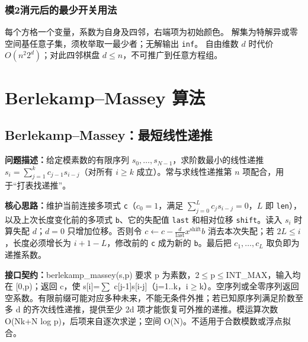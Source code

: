 \subsection{模2消元后的最少开关用法}\label{knowledge-switch-min}
每个方格一个变量，系数为自身及四邻，右端项为初始颜色。
解集为特解异或零空间基任意子集，须枚举取一最少者；无解输出 \texttt{inf}。
自由维数 $d$ 时代价 $O(n^2 2^d)$；对此四邻棋盘 $d\le n$，不可推广到任意方程组。


\Needspace{360pt}


\Needspace{680pt}

\chapter{Berlekamp–Massey 算法}

\section{Berlekamp--Massey：最短线性递推}\label{compact-berlekamp_massey}

\noindent\textbf{问题描述：}\allowbreak 给定模素数的有限序列 $s_0,\dots,s_{N-1}$，求阶数最小的线性递推 $s_i=\sum_{j=1}^{k}c_{j-1}s_{i-j}$（对所有 $i\ge k$ 成立）。常与求线性递推第 $n$ 项配合，用于“打表找递推”。

\textbf{核心思路：}\allowbreak 维护当前连接多项式 \texttt{c}（$c_0=1$，满足 $\sum_{j=0}^{L}c_js_{i-j}=0$，$L$ 即 \texttt{len}），以及上次长度变化前的多项式 \texttt{b}、它的失配值 \texttt{last} 和相对位移 \texttt{shift}。读入 $s_i$ 时算失配 $d$；$d=0$ 只增加位移。否则令 $c\leftarrow c-\frac{d}{\mathrm{last}}x^{\mathrm{shift}}b$ 消去本次失配；若 $2L\le i$，长度必须增长为 $i+1-L$，修改前的 \texttt{c} 成为新的 \texttt{b}。最后把 $c_1,\dots,c_L$ 取负即为递推系数。



{\sloppy{}\noindent\textbf{接口契约：}berlekamp\_massey(s,p) 要求 p 为素数，2$\le$p$\le$INT\_MAX，输入均在 [0,p)；返回 c，使 s[i]=$\sum$ c[j-1]s[i-j]（j=1..k，i$\ge$k）。空序列或全零序列返回空系数。有限前缀可能对应多种未来，不能无条件外推；若已知原序列满足阶数至多 d 的齐次线性递推，提供至少 2d 项才能恢复可外推的递推。模运算次数 O(Nk+N log p)，后项来自逐次求逆；空间 O(N)。不适用于合数模数或浮点拟合。\par}



\Needspace{312pt}

